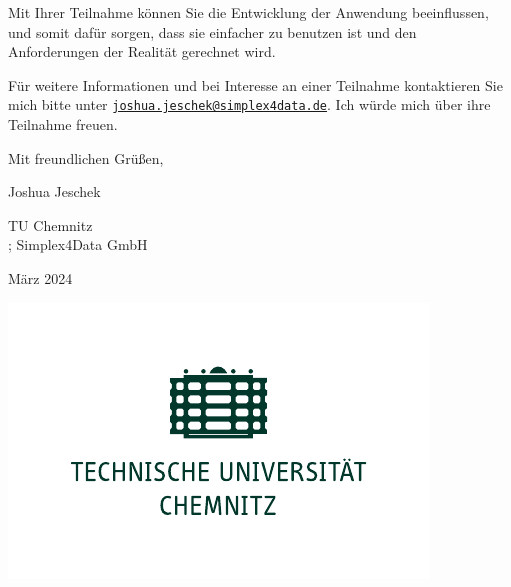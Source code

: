 Mit Ihrer Teilnahme können Sie die Entwicklung der Anwendung beeinflussen, und somit dafür sorgen, dass sie einfacher zu benutzen ist und den Anforderungen der Realität gerechnet wird.

Für weitere Informationen und bei Interesse an einer Teilnahme kontaktieren Sie mich bitte unter \texttt{\href{mailto:joshua.jeschek@simplex4data.de}{joshua.jeschek@simplex4data.de}}. Ich würde mich über ihre Teilnahme freuen.

\begin{flushright}
  Mit freundlichen Grüßen,

  Joshua Jeschek

  \vspace{\baselineskip}

  TU Chemnitz\ifdefined\STANDALONE\\\else{}; \fi
  Simplex4Data GmbH

  März 2024
\end{flushright}

\ifdefined\STANDALONE
  \vfill
  \begin{center}
    \includegraphics[scale=.75]{../assets/tuc.pdf}
  \end{center}
\fi
